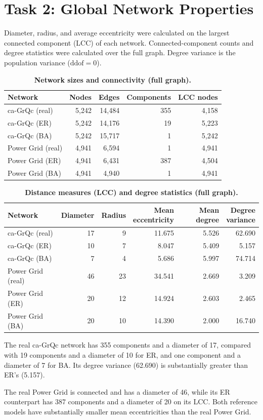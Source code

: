 \section{Task 2: Global Network Properties}

Diameter, radius, and average eccentricity were calculated on the largest connected component (LCC) of each network. Connected-component counts and degree statistics were calculated over the full graph. Degree variance is the population variance ($\mathrm{ddof}=0$).

\begin{table}[!htbp]
\centering
\caption{\textbf{Network sizes and connectivity (full graph).}}
\label{tab:global-connectivity}
\small
\begin{tabularx}{\linewidth}{@{}Xrrrr@{}}
\toprule
Network & Nodes & Edges & Components & LCC nodes \\
\midrule
ca-GrQc (real) & 5,242 & 14,484 & 355 & 4,158 \\
ca-GrQc (ER) & 5,242 & 14,176 & 19 & 5,223 \\
ca-GrQc (BA) & 5,242 & 15,717 & 1 & 5,242 \\
Power Grid (real) & 4,941 & 6,594 & 1 & 4,941 \\
Power Grid (ER) & 4,941 & 6,431 & 387 & 4,504 \\
Power Grid (BA) & 4,941 & 4,940 & 1 & 4,941 \\
\bottomrule
\end{tabularx}
\end{table}

\begin{table}[!htbp]
\centering
\caption{\textbf{Distance measures (LCC) and degree statistics (full graph).}}
\label{tab:global-distances}
\small
\setlength{\tabcolsep}{4pt}
\begin{tabularx}{\linewidth}{@{}Xrrrrr@{}}
\toprule
Network & Diameter & Radius & \shortstack[r]{Mean\\eccentricity} & Mean degree & \shortstack[r]{Degree\\variance} \\
\midrule
ca-GrQc (real) & 17 & 9 & 11.675 & 5.526 & 62.690 \\
ca-GrQc (ER) & 10 & 7 & 8.047 & 5.409 & 5.157 \\
ca-GrQc (BA) & 7 & 4 & 5.686 & 5.997 & 74.714 \\
Power Grid (real) & 46 & 23 & 34.541 & 2.669 & 3.209 \\
Power Grid (ER) & 20 & 12 & 14.924 & 2.603 & 2.465 \\
Power Grid (BA) & 20 & 10 & 14.390 & 2.000 & 16.740 \\
\bottomrule
\end{tabularx}
\end{table}

The real ca-GrQc network has 355 components and a diameter of 17, compared with 19 components and a diameter of 10 for ER, and one component and a diameter of 7 for BA. Its degree variance (62.690) is substantially greater than ER's (5.157).

The real Power Grid is connected and has a diameter of 46, while its ER counterpart has 387 components and a diameter of 20 on its LCC. Both reference models have substantially smaller mean eccentricities than the real Power Grid.
